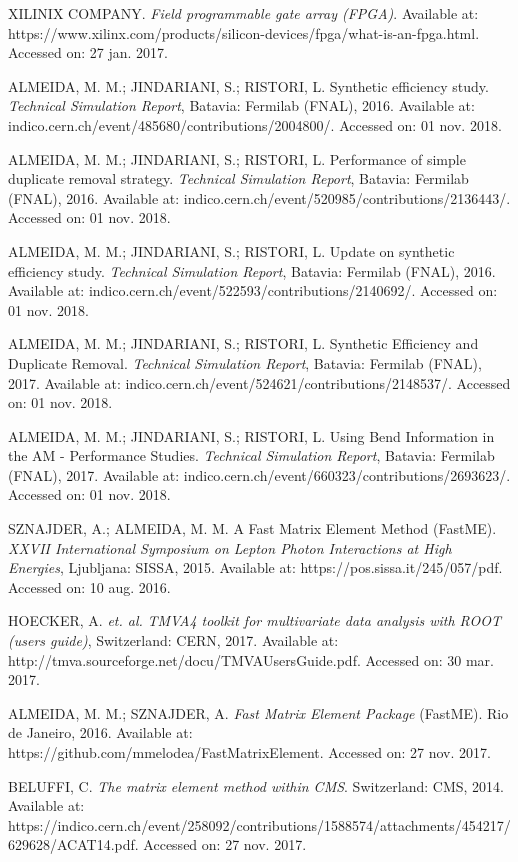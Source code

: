 \begin{thebibliography}{}
XILINIX COMPANY. \textit{Field programmable gate array (FPGA)}. Available at: https://www.xilinx.com/products/silicon-devices/fpga/what-is-an-fpga.html. Accessed on: 27 jan. 2017.

ALMEIDA, M. M.; JINDARIANI, S.; RISTORI, L. Synthetic efficiency study. \textit{Technical Simulation Report}, Batavia: Fermilab (FNAL), 2016. Available at: indico.cern.ch/event/485680/contributions/2004800/. Accessed on: 01 nov. 2018.

ALMEIDA, M. M.; JINDARIANI, S.; RISTORI, L. Performance of simple duplicate removal strategy. \textit{Technical Simulation Report}, Batavia: Fermilab (FNAL), 2016. Available at: indico.cern.ch/event/520985/contributions/2136443/. Accessed on: 01 nov. 2018.
	
ALMEIDA, M. M.; JINDARIANI, S.; RISTORI, L. Update on synthetic efficiency study. \textit{Technical Simulation Report}, Batavia: Fermilab (FNAL), 2016. Available at: indico.cern.ch/event/522593/contributions/2140692/. Accessed on: 01 nov. 2018.

ALMEIDA, M. M.; JINDARIANI, S.; RISTORI, L. Synthetic Efficiency and Duplicate Removal. \textit{Technical Simulation Report}, Batavia: Fermilab (FNAL), 2017. Available at: indico.cern.ch/event/524621/contributions/2148537/. Accessed on: 01 nov. 2018.
	
ALMEIDA, M. M.; JINDARIANI, S.; RISTORI, L. Using Bend Information in the AM - Performance Studies. \textit{Technical Simulation Report}, Batavia: Fermilab (FNAL), 2017. Available at: indico.cern.ch/event/660323/contributions/2693623/. Accessed on: 01 nov. 2018.
	
SZNAJDER, A.; ALMEIDA, M. M. A Fast Matrix Element Method (FastME). \textit{XXVII International Symposium on Lepton Photon Interactions at High Energies}, Ljubljana: SISSA, 2015. Available at: https://pos.sissa.it/245/057/pdf. Accessed on: 10 aug. 2016.

HOECKER, A.  \textit{et. al.} \textit{TMVA4 toolkit for multivariate data analysis with ROOT (users guide)}, Switzerland: CERN, 2017. Available at: http://tmva.sourceforge.net/docu/TMVAUsersGuide.pdf. Accessed on: 30 mar. 2017.


ALMEIDA, M. M.; SZNAJDER, A. \textit{Fast Matrix Element Package} (FastME). Rio de Janeiro, 2016. Available at: https://github.com/mmelodea/FastMatrixElement. Accessed on: 27 nov. 2017.

BELUFFI, C. \textit{The matrix element method within CMS}. Switzerland: CMS, 2014. Available at: https://indico.cern.ch/event/258092/contributions/1588574/attachments/454217/629628/ACAT14.pdf. Accessed on: 27 nov. 2017.

\end{thebibliography}
